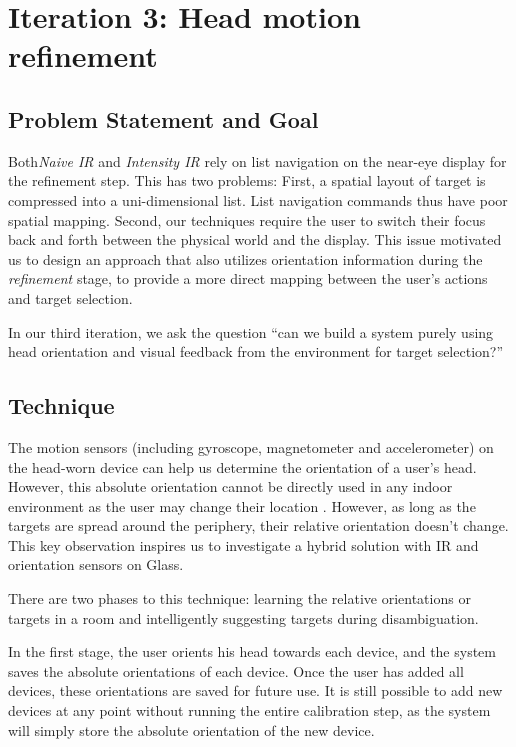\section{Iteration 3: Head motion refinement}
\label{sec:iteration-3:-head}
\subsection{Problem Statement and Goal}
Both{\em Naive IR} and {\em Intensity IR} rely on list navigation on the near-eye display for the refinement step. This has two problems: First, a spatial layout of target is compressed into a uni-dimensional list. List navigation commands thus have poor spatial mapping. Second, our techniques require the user to switch their focus back and forth between the physical world and the display. This issue motivated us to design an approach that also utilizes orientation information during the {\em refinement} stage, to provide a more direct mapping between the user's actions and target selection.

In our third iteration, we ask the question ``can we build a system purely using head orientation and visual feedback from the environment for target selection?''

\subsection{Technique}
The motion sensors (including gyroscope, magnetometer and accelerometer) on the head-worn device can help us determine the orientation of a user's head. However, this absolute orientation cannot be directly used in any indoor environment as the user may change their location . However, as long as the targets are spread around the periphery, their relative orientation doesn't change. This key observation inspires us to investigate a hybrid solution with IR and orientation sensors on Glass.

There are two phases to this technique: learning the relative orientations or targets in a room and intelligently suggesting targets during disambiguation.

In the first stage, the user orients his head towards each device, and the system saves the absolute orientations of each device. Once the user has added all devices, these orientations are saved for future use. It is still possible to add new devices at any point without running the entire calibration step, as the system will simply store the absolute orientation of the new device.

